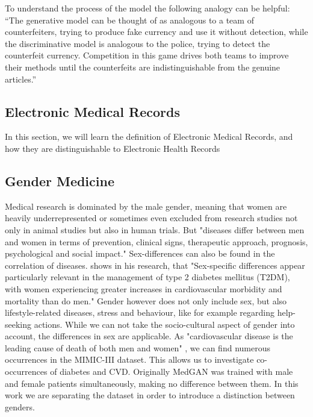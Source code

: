 \documentclass[11pt, a4paper]{book}
\begin{document}
To understand the process of the model the following analogy can be helpful:
“The generative model can be thought of as analogous to a team of counterfeiters, trying  to  produce  fake  currency  and  use  it  without  detection,  while  the  discriminative  model  is analogous to the police, trying to detect the counterfeit currency.  Competition in this game drives both teams to improve their methods until the counterfeits are indistinguishable from the genuine articles.” \citep{goodfellow2014generative}

\subsection{Electronic Medical Records}
In this section, we will learn the definition of Electronic Medical Records, and how they are distinguishable to Electronic Health Records
\subsection{Gender Medicine}
Medical research is dominated by the male gender, meaning that women are heavily underrepresented or sometimes even excluded from research studies not only in animal studies but also in human trials. \cite{baggio2013gender} 
But "diseases  differ  between  men  and  women  in  terms  of  prevention,  clinical  signs,  therapeutic  approach,  prognosis,  psychological  and  social  impact." \citep{baggio2013gender}
Sex-differences can also be found in the correlation of diseases. \citep{kautzky2010sex} shows in his research, that "Sex-specific differences appear particularly relevant in the management of type 2 diabetes mellitus (T2DM), with women experiencing greater increases in cardiovascular morbidity and mortality than do men." \citep{kautzky2010sex}
Gender however does not only include sex, but also lifestyle-related diseases, stress and behaviour, like for example regarding help-seeking actions.
While we can not take the socio-cultural aspect of gender into account, the differences in sex are applicable.
As "cardiovascular disease is the leading cause of death of both men and women" \citep{arain2009sex}, we can find numerous occurrences in the MIMIC-III dataset. This allows us to investigate co-occurrences of diabetes and CVD.
Originally MedGAN was trained with male and female patients simultaneously, making no difference between them. In this work we are separating the dataset in order to introduce a distinction between genders.
\end{document}

